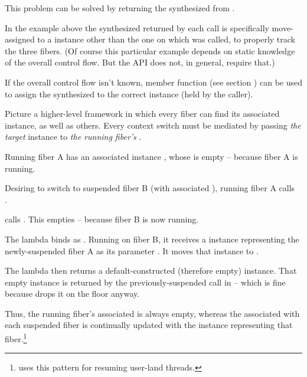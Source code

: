 This problem can be solved by returning the synthesized \fiber from \anyresume.

In the example above the synthesized \fiber returned by each \resume call is
specifically move-assigned to a \fiber instance other than the one on which \resume
was called, to properly track the three fibers. (Of course this particular example
depends on static knowledge of the overall control flow. But the API does not, in
general, require that.)

\xspace\newline

If the overall control flow isn't known, member function \anyresumewith
(see section ) can be used to assign the
synthesized \fiber to the correct \fiber instance (held by the caller).

Picture a higher-level framework in which every fiber can find its associated
 instance, as well as others. Every context switch must be mediated by
passing \emph{the target}  instance to \emph{the running fiber's}
.

Running fiber A has an associated  instance ,
whose \fiber\xspace{} is empty -- because fiber A is running.

Desiring to switch to suspended fiber B (with associated
 ), running fiber A calls\\
.

 calls .
This empties  -- because fiber B is now running.

The lambda binds  as . Running on fiber B, it
receives a \fiber instance representing the newly-suspended fiber A as its
parameter . It moves that \fiber instance to .

The lambda then returns a default-constructed (therefore empty) \fiber
instance. That empty instance is returned by the previously-suspended
\resumewith call in  -- which is fine because
 drops it on the floor anyway.

Thus, the running fiber's associated  is always empty,
whereas the  associated with each suspended fiber is continually
updated with the \fiber instance representing that
fiber.\footnote{\bfiber\cite{bfiber} uses this pattern for resuming user-land
threads.}

